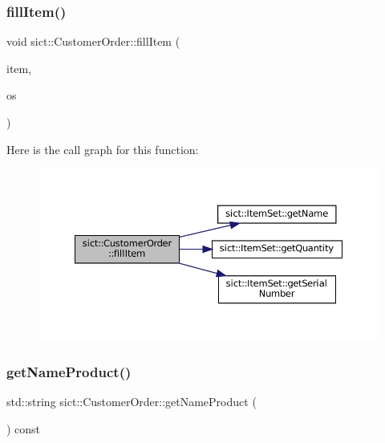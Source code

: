 \subsubsection{\texorpdfstring{fillItem()}{fillItem()}}
{\footnotesize\ttfamily void sict\+::\+Customer\+Order\+::fill\+Item (\begin{DoxyParamCaption}\item[{\mbox{\hyperlink{classsict_1_1ItemSet}{Item\+Set}} \&}]{item,  }\item[{std\+::ostream \&}]{os }\end{DoxyParamCaption})}

Here is the call graph for this function\+:
\nopagebreak
\begin{figure}[H]
\begin{center}
\leavevmode
\includegraphics[width=350pt]{classsict_1_1CustomerOrder_a08ec1a2acdd124da489e2e9177349ffb_cgraph}
\end{center}
\end{figure}
\mbox{\label{classsict_1_1CustomerOrder_a9476430dd30e84d937af5b433e7c6471}} 
\subsubsection{\texorpdfstring{getNameProduct()}{getNameProduct()}}
{\footnotesize\ttfamily std\+::string sict\+::\+Customer\+Order\+::get\+Name\+Product (\begin{DoxyParamCaption}{ }\end{DoxyParamCaption}) const}

\mbox{\label{classsict_1_1CustomerOrder_a70160bacde7481aaeb51d1455429199f}} 
